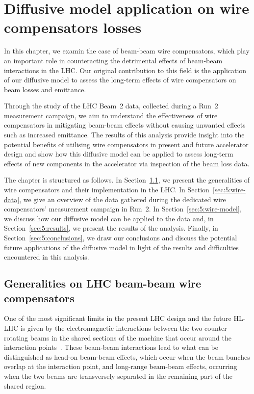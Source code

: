 \chapter{Diffusive model application on wire compensators losses}\label{ch:wire-compensators}

In this chapter, we examin the case of beam-beam wire compensators, which play an important role in counteracting the detrimental effects of beam-beam interactions in the LHC. Our original contribution to this field is the application of our diffusive model to assess the long-term effects of wire compensators on beam losses and emittance.

Through the study of the LHC Beam~2 data, collected during a Run~2 measurement campaign, we aim to understand the effectiveness of wire compensators in mitigating beam-beam effects without causing unwanted effects such as increased emittance. The results of this analysis provide insight into the potential benefits of utilising wire compensators in present and future accelerator design and show how this diffusive model can be applied to assess long-term effects of new components in the accelerator via inspection of the beam loss data.

The chapter is structured as follows. In Section~\ref{sec:5:wire-compensators}, we present the generalities of wire compensators and their implementation in the LHC. In Section~\ref{sec:5:wire-data}, we give an overview of the data gathered during the dedicated wire compensators' measurement campaign in Run~2. In Section~\ref{sec:5:wire-model}, we discuss how our diffusive model can be applied to the data and, in Section~\ref{sec:5:results}, we present the results of the analysis. Finally, in Section~\ref{sec:5:conclusions}, we draw our conclusions and discuss the potential future applications of the diffusive model in light of the results and difficulties encountered in this analysis.

\section{Generalities on LHC beam-beam wire compensators}\label{sec:5:wire-compensators}

One of the most significant limits in the present LHC design and the future HL-LHC is given by the electromagnetic interactions between the two counter-rotating beams in the shared sections of the machine that occur around the interaction points~\cite{Arduini_2016}. These beam-beam interactions lead to what can be distinguished as head-on beam-beam effects, which occur when the beam bunches overlap at the interaction point, and long-range beam-beam effects, occurring when the two beams are transversely separated in the remaining part of the shared region.

